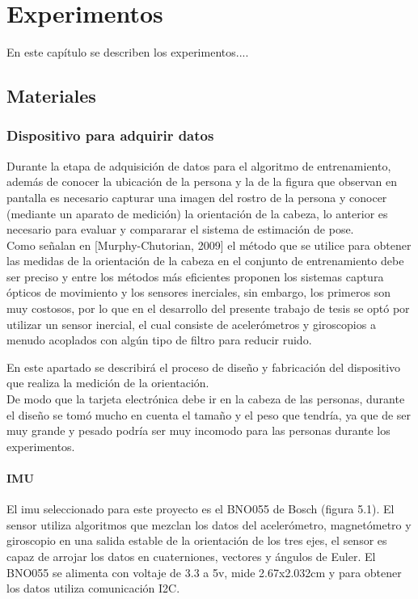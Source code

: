\chapter{Experimentos}
En este capítulo se describen los experimentos....

\section{Materiales}
     \subsection{Dispositivo para adquirir datos}
     Durante la etapa de adquisición de datos para el algoritmo de entrenamiento, además de conocer la ubicación de la persona y la de la figura que observan en pantalla es necesario capturar una imagen del rostro de la persona y conocer (mediante un aparato de medición) la orientación de la cabeza, lo anterior es necesario para evaluar y compararar el sistema de estimación de pose. \\
     Como señalan en [Murphy-Chutorian, 2009] el método que se utilice para obtener las medidas de la orientación de la cabeza en el conjunto de entrenamiento debe ser preciso y entre los métodos más eficientes proponen los sistemas captura ópticos de movimiento y los sensores inerciales, sin embargo, los primeros son muy costosos, por lo que en el desarrollo del presente trabajo de tesis se optó por utilizar un sensor inercial, el cual consiste de acelerómetros y giroscopios a menudo acoplados con algún tipo de filtro para reducir ruido.
     
     En este apartado se describirá el proceso de diseño y fabricación del dispositivo que realiza la medición de la orientación.\\
     De modo que la tarjeta electrónica debe ir en la cabeza de las personas, durante el diseño se tomó mucho en cuenta el tamaño y el peso que tendría, ya que de ser muy grande y  pesado podría ser muy incomodo para las personas durante los experimentos. 
     
     \subsubsection{IMU}
     El imu seleccionado para este proyecto es el BNO055 de Bosch (figura 5.1). El sensor utiliza algoritmos que mezclan los datos del acelerómetro, magnetómetro y giroscopio en una salida estable de la orientación de los tres ejes, el sensor es capaz de arrojar los datos en cuaterniones, vectores y ángulos de Euler. El BNO055 se alimenta con voltaje de 3.3 a 5v, mide 2.67x2.032cm y para obtener los datos utiliza comunicación I2C.
     
